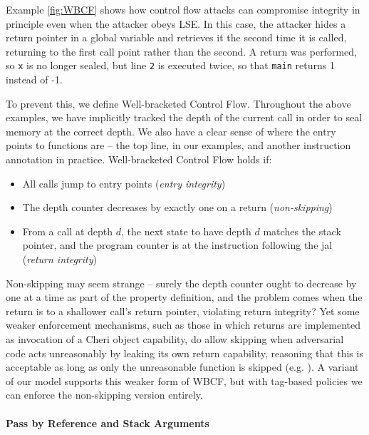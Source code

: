\documentclass[acmsmall,review,anonymous]{acmart}\settopmatter{printfolios=true,printccs=false,printacmref=false}
\begin{document}
Example \ref{fig:WBCF} shows how control flow attacks can compromise integrity in principle
even when the attacker obeys LSE. In this case, the attacker hides a return pointer in a
global variable and retrieves it the second time it is called, returning to the first call
point rather than the second. A return was performed, so {\tt x} is no longer sealed, but
line {\tt 2} is executed twice, so that {\tt main} returns 1 instead of -1.

To prevent this, we define Well-bracketed Control Flow. Throughout the above examples, we
have implicitly tracked the depth of the current call in order to seal memory at the correct
depth. We also have a clear sense of where the entry points to functions are -- the top line,
in our examples, and another instruction annotation in practice. Well-bracketed Control Flow
holds if:

\begin{itemize}
\item All calls jump to entry points ({\em entry integrity})
\item The depth counter decreases by exactly one on a return ({\em non-skipping})
\item From a call at depth \(d\), the next state to have depth \(d\) matches the stack pointer,
  and the program counter is at the instruction following the jal ({\em return integrity})
\end{itemize}

Non-skipping may seem strange -- surely the depth counter ought to decrease by one at a time
as part of the property definition, and the problem comes when the return is to a shallower
call's return pointer, violating return integrity? Yet some weaker enforcement mechanisms,
such as those in which returns are implemented as invocation of a Cheri object capability,
do allow skipping when adversarial code acts unreasonably by leaking its own return capability,
reasoning that this is acceptable as long as only the unreasonable function is skipped
(e.g. \citep{Skorstengaard+19b}). A variant of our model supports this weaker form of WBCF,
but with tag-based policies we can enforce the non-skipping version entirely.

\paragraph*{Pass by Reference and Stack Arguments}

\newcommand{\mainpassc}{magenta}
\newcommand{\sharec}{lgray}
\end{document}
